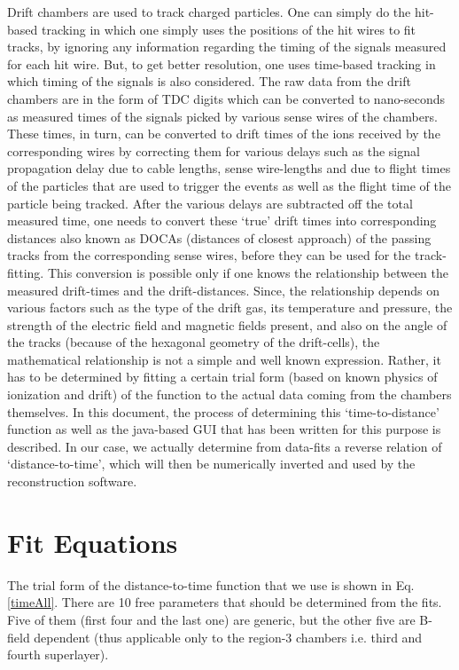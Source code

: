 \documentclass[12pt,epsfig]{article}
\begin{document}
Drift chambers are used to track charged particles. One can simply do the hit-based tracking in which one simply uses the positions of the hit wires to fit tracks, by ignoring any information regarding the timing of the signals measured for each hit wire. But, to get better resolution, one uses time-based tracking in which timing of the signals is also considered. The raw data from the drift chambers are in the form of TDC digits which can be converted to nano-seconds as measured times of the signals picked by various sense wires of the chambers. These times, in turn, can be converted to drift times of the ions received by the corresponding wires by correcting them for various delays such as the signal propagation delay due to cable lengths, sense wire-lengths and due to flight times of the particles that are used to trigger the events as well as the flight time of the particle being tracked. After the various delays are subtracted off the total measured time, one needs to convert these `true' drift times into corresponding distances also known as DOCAs (distances of closest approach) of the passing tracks from the corresponding sense wires, before they can be used for the track-fitting. This conversion is possible only if one knows the relationship between the measured drift-times and the drift-distances. Since, the relationship depends on various factors such as the type of the drift gas, its temperature and pressure, the strength of the electric field and magnetic fields present, and also on the angle of the tracks (because of the hexagonal geometry of the drift-cells), the mathematical relationship is not a simple and well known expression. Rather, it has to be determined by fitting a certain trial form (based on known physics of ionization and drift) of the function to the actual data coming from the chambers themselves. In this document, the process of determining this `time-to-distance' function as well as the java-based GUI that has been written for this purpose is described. In our case, we actually determine from data-fits a reverse relation of `distance-to-time', which will then be numerically inverted and used by the reconstruction software.



\section{Fit Equations}
\label{sFitEquations}

The trial form of the distance-to-time function that we use is shown in Eq. \ref{timeAll}. 
There are 10 free parameters that should be determined from the fits. Five of them (first four and the last one) are generic, but the other five are B-field dependent (thus applicable only to the region-3 chambers i.e. third and fourth superlayer).
\end{document}
